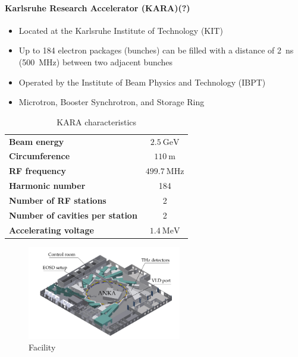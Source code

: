 \paragraph{Karlsruhe Research Accelerator (KARA)(?)}
\begin{itemize}[noitemsep]
	\item Located at the Karlsruhe Institute of Technology (KIT)
	\item Up to 184 electron packages (bunches) can be filled with a distance of \SI{2}{\nano \second} (\SI{500}{\mega \hertz}) between two adjacent bunches 
	\item Operated by the Institute of Beam Physics and Technology (IBPT)
	\item Microtron, Booster Synchrotron, and Storage Ring
\end{itemize}

\begin{table}[tbh!]
	\caption{KARA characteristics}
	\label{tab:kara}
	\begin{minipage}{\textwidth}
		\centering
		\begin{tabularx}{\textwidth}{XS}
			\toprule
			\textbf{Beam energy}     				& $ \SI{2.5}{\giga \electronvolt}$ \\
			\textbf{Circumference} 	 				& $\SI{110}{\meter}$	  \\
			\textbf{RF frequency }   				& $\SI{499.7}{\mega \hertz}$ 	\\
			\textbf{Harmonic number} 				& 184	\\
			\textbf{Number of RF stations} 			& 2 \\
			\textbf{Number of cavities per station} 	& 2	\\
			\textbf{Accelerating voltage} 					& $\SI{1.4}{\mega \electronvolt}$ \\
			\bottomrule		\end{tabularx}
	\end{minipage}
\end{table}



\begin{figure}[H]
	\centering
	\includegraphics[width = 0.6\textwidth]{chap/02-theory/img/kara.png}
	\caption{Facility \cite{rota2018}}
	\label{fig:kara}
\end{figure}

